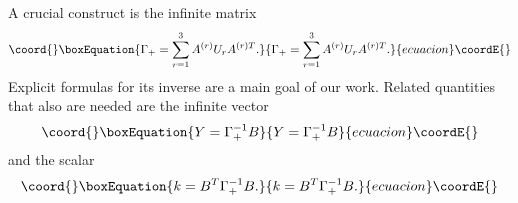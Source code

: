 \documentclass[a4paper,12pt]{article}
\begin{document}
A crucial construct is the infinite matrix
\begin{equation}\coord{}\boxEquation{
\Gamma_+ = \sum_{r=1}^3 A^{(r)} U_r A^{(r)T}.
}{
\Gamma_+ = \sum_{r=1}^3 A^{(r)} U_r A^{(r)T}.
}{ecuacion}\coordE{}\end{equation}
Explicit formulas for its inverse are a main goal of our work.
Related quantities that also are needed are the infinite vector
\begin{equation}\coord{}\boxEquation{
Y = \Gamma_+^{-1} B
}{
Y = \Gamma_+^{-1} B
}{ecuacion}\coordE{}\end{equation}
and the scalar
\begin{equation}\coord{}\boxEquation{
k = B^T \Gamma_+^{-1} B.
}{
k = B^T \Gamma_+^{-1} B.
}{ecuacion}\coordE{}\end{equation}
\end{document}
